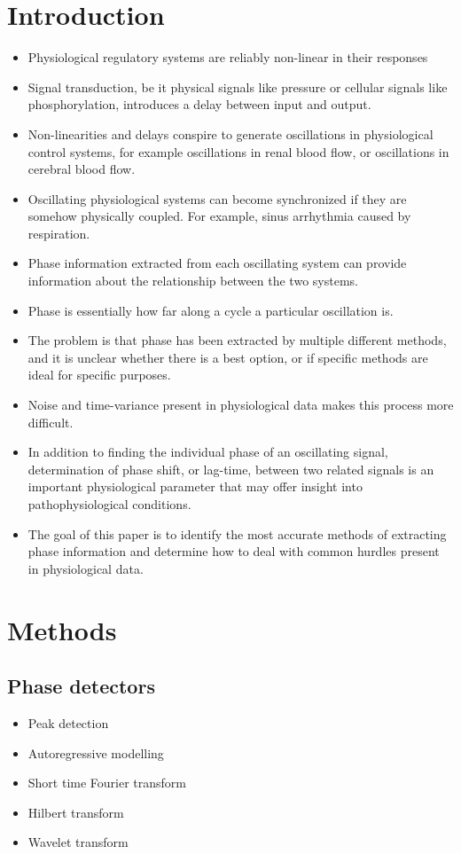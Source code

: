 \documentclass{article}
\begin{document}
\section*{Introduction}
\begin{itemize}
\item Physiological regulatory systems are reliably non-linear in their responses
\item Signal transduction, be it physical signals like pressure or cellular signals like phosphorylation, introduces a delay between input and output. 
\item Non-linearities and delays conspire to generate oscillations in physiological control systems, for example oscillations in renal blood flow, or oscillations in cerebral blood flow.
\item Oscillating physiological systems can become synchronized if they are somehow physically coupled. For example, sinus arrhythmia caused by respiration. 
\item Phase information extracted from each oscillating system can provide information about the relationship between the two systems.
\item Phase is essentially how far along a cycle a particular oscillation is. 
\item The problem is that phase has been extracted by multiple different methods, and it is unclear whether there is a best option, or if specific methods are ideal for specific purposes.
\item Noise and time-variance present in physiological data makes this process more difficult.

\item In addition to finding the individual phase of an oscillating signal, determination of phase shift, or lag-time, between two related signals is an important physiological parameter that may offer insight into pathophysiological conditions.  
\item The goal of this paper is to identify the most accurate methods of extracting phase information and determine how to deal with common hurdles present in physiological data.
\end{itemize}

\section*{Methods}

\subsection*{Phase detectors}
\begin{itemize}
\item Peak detection
\item Autoregressive modelling
\item Short time Fourier transform
\item Hilbert transform
\item Wavelet transform
\end{itemize}
\end{document}
